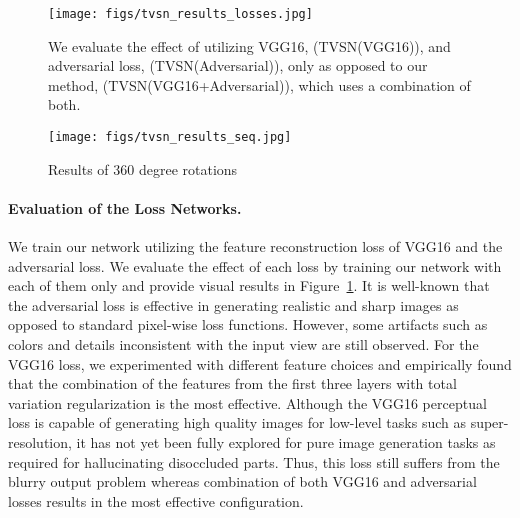 \documentclass[10pt,twocolumn,letterpaper]{article}
\begin{document}
\begin{figure}[t]
\vspace{-2mm}
\begin{center}
\texttt{[image: figs/tvsn\_results\_losses.jpg]}
\end{center}
\caption{We evaluate the effect of utilizing VGG16, (TVSN(VGG16)), and adversarial loss, (TVSN(Adversarial)), only as opposed to our method, (TVSN(VGG16+Adversarial)), which uses a combination of both.}
\label{fig:tvsn_results_losses}
\vspace{-3mm}
\end{figure}



\begin{figure*}[t]
\vspace{-2mm}
\begin{center}
\texttt{[image: figs/tvsn\_results\_seq.jpg]}
\end{center}
\caption{Results of 360 degree rotations}
\label{fig:tvsn_results_seq}
\vspace{-2mm}
\end{figure*}


\vspace{-3mm}
\paragraph{Evaluation of the Loss Networks.} We train our network utilizing the feature reconstruction loss of VGG16 and the adversarial loss. We evaluate the effect of each loss by training our network with each of them only and provide visual results in Figure~\ref{fig:tvsn_results_losses}. It is well-known that the adversarial loss is effective in generating realistic and sharp images as opposed to standard pixel-wise loss functions. However, some artifacts such as colors and details inconsistent with the input view are still observed. For the VGG16 loss, we experimented with different feature choices and empirically found that the combination of the features from the first three layers with total variation regularization is the most effective. Although the VGG16 perceptual loss is capable of generating high quality images for low-level tasks such as super-resolution, it has not yet been fully explored for pure image generation tasks as required for hallucinating disoccluded parts. Thus, this loss still suffers from the blurry output problem whereas combination of both VGG16 and adversarial losses results in the most effective configuration.
\end{document}
